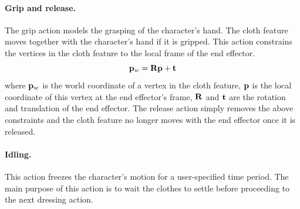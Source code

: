 \paragraph{Grip and release.}
The grip action models the grasping of the character's hand. The cloth feature moves together with the character's hand if it is gripped. This action constrains the vertices in the cloth feature to the local frame of the end effector.
\begin{displaymath}
\mathbf{p}_w = \mathbf{Rp} + \mathbf{t}
\end{displaymath}
where $\mathbf{p}_w$ is the world coordinate of a vertex in the cloth feature, $\mathbf{p}$ is the local coordinate of this vertex at the end effector's frame, $\mathbf{R}$ and $\mathbf{t}$ are the rotation and translation of the end effector. The release action simply removes the above constraints and the cloth feature no longer moves with the end effector once it is released.

\paragraph{Idling.} This action freezes the character's motion for a user-specified time period. The main purpose of this action is to wait the clothes to settle before proceeding to the next dressing action.


